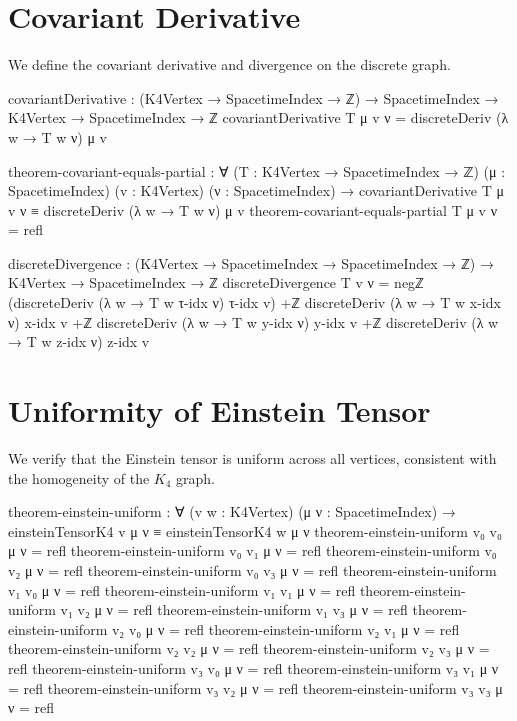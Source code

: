 \documentclass[11pt,a4paper]{book}
\begin{document}
\section{Covariant Derivative}

We define the covariant derivative and divergence on the discrete graph.

\begin{code}
covariantDerivative : (K4Vertex → SpacetimeIndex → ℤ) → 
                       SpacetimeIndex → K4Vertex → SpacetimeIndex → ℤ
covariantDerivative T μ v ν = 
  discreteDeriv (λ w → T w ν) μ v

theorem-covariant-equals-partial : ∀ (T : K4Vertex → SpacetimeIndex → ℤ)
                                     (μ : SpacetimeIndex) (v : K4Vertex) (ν : SpacetimeIndex) →
  covariantDerivative T μ v ν ≡ discreteDeriv (λ w → T w ν) μ v
theorem-covariant-equals-partial T μ v ν = refl

discreteDivergence : (K4Vertex → SpacetimeIndex → SpacetimeIndex → ℤ) → 
                      K4Vertex → SpacetimeIndex → ℤ
discreteDivergence T v ν = 
  negℤ (discreteDeriv (λ w → T w τ-idx ν) τ-idx v) +ℤ
  discreteDeriv (λ w → T w x-idx ν) x-idx v +ℤ
  discreteDeriv (λ w → T w y-idx ν) y-idx v +ℤ
  discreteDeriv (λ w → T w z-idx ν) z-idx v
\end{code}

\section{Uniformity of Einstein Tensor}

We verify that the Einstein tensor is uniform across all vertices, consistent with the homogeneity of the $K_4$ graph.

\begin{code}
theorem-einstein-uniform : ∀ (v w : K4Vertex) (μ ν : SpacetimeIndex) →
  einsteinTensorK4 v μ ν ≡ einsteinTensorK4 w μ ν
theorem-einstein-uniform v₀ v₀ μ ν = refl
theorem-einstein-uniform v₀ v₁ μ ν = refl
theorem-einstein-uniform v₀ v₂ μ ν = refl
theorem-einstein-uniform v₀ v₃ μ ν = refl
theorem-einstein-uniform v₁ v₀ μ ν = refl
theorem-einstein-uniform v₁ v₁ μ ν = refl
theorem-einstein-uniform v₁ v₂ μ ν = refl
theorem-einstein-uniform v₁ v₃ μ ν = refl
theorem-einstein-uniform v₂ v₀ μ ν = refl
theorem-einstein-uniform v₂ v₁ μ ν = refl
theorem-einstein-uniform v₂ v₂ μ ν = refl
theorem-einstein-uniform v₂ v₃ μ ν = refl
theorem-einstein-uniform v₃ v₀ μ ν = refl
theorem-einstein-uniform v₃ v₁ μ ν = refl
theorem-einstein-uniform v₃ v₂ μ ν = refl
theorem-einstein-uniform v₃ v₃ μ ν = refl
\end{code}
\end{document}
